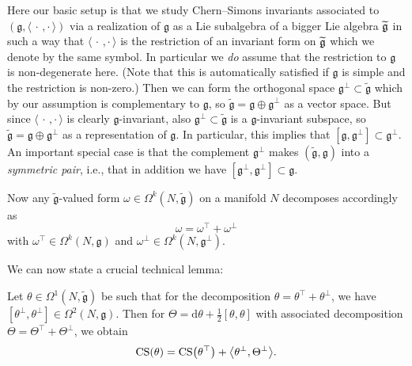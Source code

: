 \documentclass[AHL,Unicode,longabstracts]{cedram}
\newcommand{\om}{\omega}
\renewcommand{\th}{\theta}
\newcommand{\Om}{\Omega}
\newcommand{\B}[2]{\langle#1,#2\rangle}
\DeclareMathOperator{\CS}{CS}
\renewcommand*{\d}{\mathrm{d}}
\newcommand{\tfg}{\widetilde{\mathfrak g}}
\newcommand{\fkg}{\mathfrak{g}}
\let\originalleft\left
\let\originalright\right
\renewcommand{\left}{\mathopen{}\mathclose\bgroup\originalleft}
\renewcommand{\right}{\aftergroup\egroup\originalright}
\let\oldtilde\tilde
\renewcommand*{\tilde}[1]{\mathchoice{\widetilde{#1}}{\widetilde{#1}}{\oldtilde{#1}}{\oldtilde{#1}}}
\begin{document}
Here our basic setup is that we study Chern--Simons invariants associated to $(\fkg,\B{\,\cdot\,}{\cdot\,})$ via a realization of $\fkg$ as a Lie subalgebra of a bigger Lie algebra $\tilde{\fkg}$ in such a way that $\B{\,\cdot\,}{\cdot\,}$ is the restriction of an invariant form on $\tilde{\fkg}$ which we denote by the same symbol. In particular we \emph{do} assume that the restriction to $\fkg$ is non-degenerate here. (Note that this is automatically satisfied if $\fkg$ is simple and the restriction is non-zero.) Then we can form the orthogonal space $\fkg^\perp\subset\tfg$ which by our assumption is complementary to $\fkg$, so $\tfg=\fkg\oplus\fkg^\perp$ as a vector space. But since $\B{\,\cdot\,}{\cdot\,}$ is clearly $\fkg$-invariant, also $\fkg^\perp\subset\tfg$ is a $\fkg$-invariant subspace, so $\tfg=\fkg\oplus\fkg^\perp$ as a representation of $\fkg$. In particular, this implies that $[\fkg,\fkg^\perp]\subset\fkg^\perp$. An important special case is that the complement $\fkg^\perp$ makes $(\tfg,\fkg)$ into a \emph{symmetric pair}, i.e., that in addition we have $[\fkg^\perp,\fkg^\perp]\subset\fkg$.

Now any $\tfg$-valued form $\om\in\Om^k(N,\tfg)$ on a manifold $N$ decomposes accordingly as
\[
\om=\om^\top+\om^\perp
\]
with $\om^\top\in\Om^k(N,\fkg)$ and $\om^{\perp}\in\Om^k(N,\fkg^\perp)$.

We can now state a crucial technical lemma:

\begin{lemm}\label{lem:CS-pairs}
Let $\th\in\Om^1(N,\tfg)$ be such that for the decomposition $\th=\th^\top+\th^\perp$, we have $[\th^\perp,\th^\perp]\in\Om^2(N,\fkg)$. Then for $\Theta=\d\th+\frac12[\th,\th]$ with associated decomposition $\Theta=\Theta^\top+\Theta^\perp$, we obtain
\begin{equation}\label{eqn:partialblindness}
\CS(\th)=\CS\left(\th^\top\right)+\left\langle\th^\perp,\Theta^\perp\right\rangle.
\end{equation}
\end{lemm}
\end{document}
